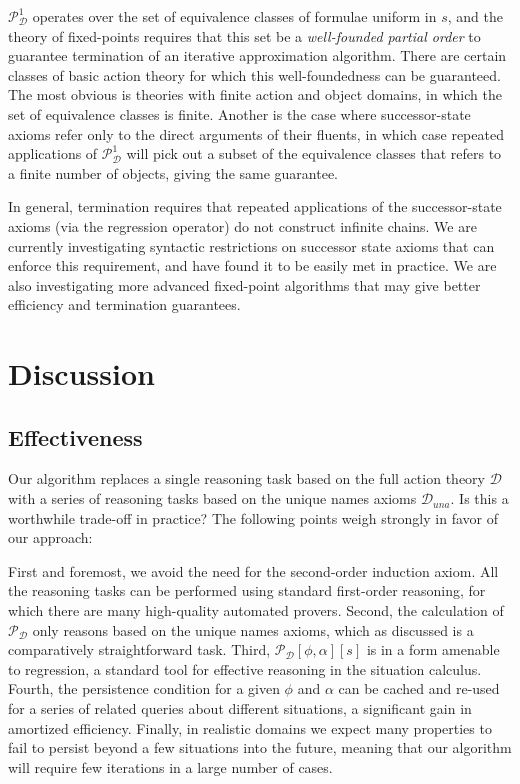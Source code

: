 $\mathcal{P}_{\mathcal{D}}^{1}$ operates over the set of equivalence
classes of formulae uniform in $s$, and the theory of fixed-points
requires that this set be a \emph{well-founded partial order} to guarantee
termination of an iterative approximation algorithm. There are certain
classes of basic action theory for which this well-foundedness can
be guaranteed. The most obvious is theories with finite action and
object domains, in which the set of equivalence classes is finite.
Another is the case where successor-state axioms refer only to the
direct arguments of their fluents, in which case repeated applications
of $\mathcal{P}_{\mathcal{D}}^{1}$ will pick out a subset of the
equivalence classes that refers to a finite number of objects, giving
the same guarantee.

In general, termination requires that repeated applications of the
successor-state axioms (via the regression operator) do not construct
infinite chains. We are currently investigating syntactic restrictions
on successor state axioms that can enforce this requirement, and have
found it to be easily met in practice. We are also investigating more
advanced fixed-point algorithms that may give better efficiency and
termination guarantees.


\section{Discussion}


\subsection{Effectiveness}

Our algorithm replaces a single reasoning task based on the full action
theory $\mathcal{D}$ with a series of reasoning tasks based on the
unique names axioms $\mathcal{D}_{una}$. Is this a worthwhile trade-off
in practice? The following points weigh strongly in favor of our approach:

First and foremost, we avoid the need for the second-order induction
axiom. All the reasoning tasks can be performed using standard first-order
reasoning, for which there are many high-quality automated provers.
Second, the calculation of $\mathcal{P_{D}}$ only reasons based on
the unique names axioms, which as discussed is a comparatively straightforward
task. Third, $\mathcal{P}_{\mathcal{D}}[\phi,\alpha][s]$ is in a
form amenable to regression, a standard tool for effective reasoning
in the situation calculus. Fourth, the persistence condition for a
given $\phi$ and $\alpha$ can be cached and re-used for a series
of related queries about different situations, a significant gain
in amortized efficiency. Finally, in realistic domains we expect many
properties to fail to persist beyond a few situations into the future,
meaning that our algorithm will require few iterations in a large
number of cases.

